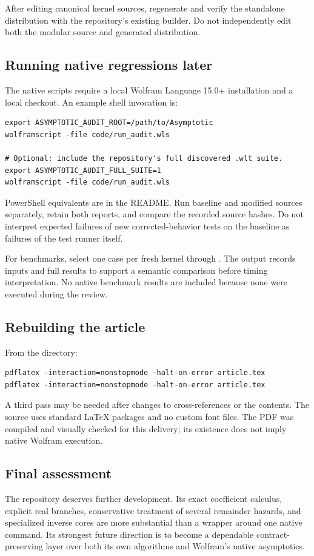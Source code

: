 After editing canonical kernel sources, regenerate and verify the standalone distribution with the repository's existing builder. Do not independently edit both the modular source and generated distribution.\cite{development}

\subsection{Running native regressions later}
The native scripts require a local Wolfram Language 15.0+ installation and a local checkout. An example shell invocation is:
\begin{lstlisting}
export ASYMPTOTIC_AUDIT_ROOT=/path/to/Asymptotic
wolframscript -file code/run_audit.wls

# Optional: include the repository's full discovered .wlt suite.
export ASYMPTOTIC_AUDIT_FULL_SUITE=1
wolframscript -file code/run_audit.wls
\end{lstlisting}
PowerShell equivalents are in the README. Run baseline and modified sources separately, retain both reports, and compare the recorded source hashes. Do not interpret expected failures of new corrected-behavior tests on the baseline as failures of the test runner itself.

For benchmarks, select one case per fresh kernel through . The output records inputs and full results to support a semantic comparison before timing interpretation. No native benchmark results are included because none were executed during the review.

\subsection{Rebuilding the article}
From the  directory:
\begin{lstlisting}
pdflatex -interaction=nonstopmode -halt-on-error article.tex
pdflatex -interaction=nonstopmode -halt-on-error article.tex
\end{lstlisting}
A third pass may be needed after changes to cross-references or the contents. The source uses standard LaTeX packages and no custom font files. The PDF was compiled and visually checked for this delivery; its existence does not imply native Wolfram execution.

\subsection{Final assessment}
The repository deserves further development. Its exact coefficient calculus, explicit real branches, conservative treatment of several remainder hazards, and specialized inverse cores are more substantial than a wrapper around one native command. Its strongest future direction is to become a dependable contract-preserving layer over both its own algorithms and Wolfram's native asymptotics.

